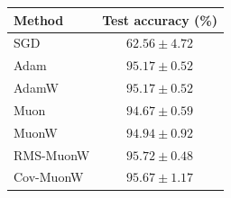 \begin{tabular}{lc}
\toprule
Method & Test accuracy (\%) \\
\midrule
SGD & $62.56 \pm 4.72$ \\
Adam & $95.17 \pm 0.52$ \\
AdamW & $95.17 \pm 0.52$ \\
Muon & $94.67 \pm 0.59$ \\
MuonW & $94.94 \pm 0.92$ \\
RMS-MuonW & $95.72 \pm 0.48$ \\
Cov-MuonW & $95.67 \pm 1.17$ \\
\bottomrule
\end{tabular}
